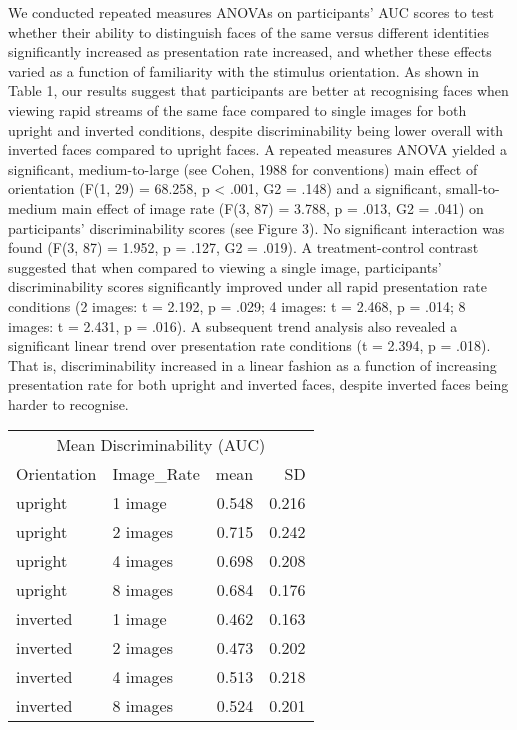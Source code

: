 \documentclass[
  english,
  man]{apa6}
\begin{document}
We conducted repeated measures ANOVAs on participants' AUC scores to test whether their ability to distinguish faces of the same versus different identities significantly increased as presentation rate increased, and whether these effects varied as a function of familiarity with the stimulus orientation. As shown in Table 1, our results suggest that participants are better at recognising faces when viewing rapid streams of the same face compared to single images for both upright and inverted conditions, despite discriminability being lower overall with inverted faces compared to upright faces. A repeated measures ANOVA yielded a significant, medium-to-large (see Cohen, 1988 for conventions) main effect of orientation (F(1, 29) = 68.258, p \textless{} .001, G2 = .148) and a significant, small-to-medium main effect of image rate (F(3, 87) = 3.788, p = .013, G2 = .041) on participants' discriminability scores (see Figure 3). No significant interaction was found (F(3, 87) = 1.952, p = .127, G2 = .019). A treatment-control contrast suggested that when compared to viewing a single image, participants' discriminability scores significantly improved under all rapid presentation rate conditions (2 images: t = 2.192, p = .029; 4 images: t = 2.468, p = .014; 8 images: t = 2.431, p = .016). A subsequent trend analysis also revealed a significant linear trend over presentation rate conditions (t = 2.394, p = .018). That is, discriminability increased in a linear fashion as a function of increasing presentation rate for both upright and inverted faces, despite inverted faces being harder to recognise.

\begin{tabular}{l|l|r|r}
\hline
\multicolumn{4}{c|}{Mean Discriminability (AUC)} \\
\cline{1-4}
Orientation & Image\_Rate & mean & SD\\
\hline
upright & 1 image & 0.548 & 0.216\\
\hline
upright & 2 images & 0.715 & 0.242\\
\hline
upright & 4 images & 0.698 & 0.208\\
\hline
upright & 8 images & 0.684 & 0.176\\
\hline
inverted & 1 image & 0.462 & 0.163\\
\hline
inverted & 2 images & 0.473 & 0.202\\
\hline
inverted & 4 images & 0.513 & 0.218\\
\hline
inverted & 8 images & 0.524 & 0.201\\
\hline
\end{tabular}
\end{document}
